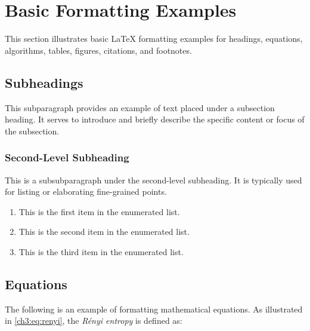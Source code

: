 \section{Basic Formatting Examples}
\begin{paragraph}
This section illustrates basic {\LaTeX} formatting examples for headings, equations, algorithms, tables, figures, citations, and footnotes.
\end{paragraph}

\subsection{Subheadings}
\begin{subparagraph}
This subparagraph provides an example of text placed under a subsection heading. It serves to introduce and briefly describe the specific content or focus of the subsection.
\end{subparagraph}


\subsubsection{Second-Level Subheading}
\begin{subsubparagraph}
This is a subsubparagraph under the second-level subheading. It is typically used for listing or elaborating fine-grained points.
\end{subsubparagraph}

\begin{enumerate}[itemindent=\subsubparitemindent]
    \item This is the first item in the enumerated list.
    \item This is the second item in the enumerated list.
    \item This is the third item in the enumerated list.
\end{enumerate}

\subsection{Equations}
\begin{subparagraph}
The following is an example of formatting mathematical equations. As illustrated in \autoref{ch3:eq:renyi}, the {\em R\'enyi entropy} is defined as:
\end{subparagraph}

